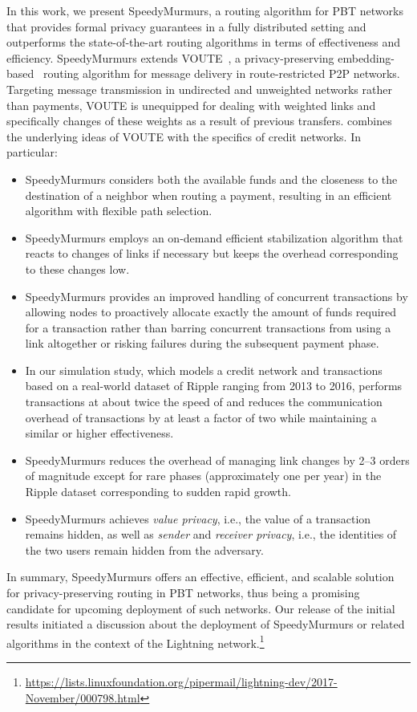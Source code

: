  

In this work, we present SpeedyMurmurs, a routing algorithm for PBT networks 
that provides formal privacy guarantees in a fully distributed setting and outperforms the state-of-the-art 
routing algorithms in terms of effectiveness and efficiency. 
SpeedyMurmurs extends VOUTE~\cite{roos2016anonymous}, a privacy-preserving embedding-based~\cite{papadimitriou2004conjecture} routing algorithm for message delivery in route-restricted P2P networks.  
Targeting message transmission in undirected and unweighted networks rather than payments, VOUTE 
is unequipped for dealing with weighted links and specifically changes of these weights as a result of previous transfers.  
\oursys combines the underlying ideas of VOUTE with the specifics of credit networks.      
In particular:
\begin{itemize}
\item SpeedyMurmurs considers both the available funds and the closeness to the destination of a neighbor when routing a payment, resulting in an efficient algorithm with flexible path selection.  
\item SpeedyMurmurs employs an on-demand efficient stabilization algorithm that reacts to changes of links if necessary but keeps the overhead corresponding to these changes low.
\item SpeedyMurmurs provides an improved handling of concurrent transactions by allowing nodes to proactively allocate exactly the amount of funds required for a transaction rather than barring concurrent transactions from using a link altogether or risking failures during the subsequent payment phase.
\item In our simulation study, which models a credit network and transactions based on a real-world dataset of Ripple ranging from 2013 to 2016, \oursys performs transactions at about twice the speed of \cnsysname and reduces the communication overhead of transactions by at least a factor of two while maintaining a similar or higher effectiveness. 
\item SpeedyMurmurs reduces the overhead of managing link changes by 2--3 orders of magnitude except for rare phases (approximately one per year) in the Ripple dataset corresponding to sudden rapid growth.
\item SpeedyMurmurs achieves \emph{value privacy}, i.e., the value of a transaction remains hidden, as well as \emph{sender} and \emph{receiver privacy}, i.e., the identities of the two users remain hidden from the adversary.   
\end{itemize}
In summary, SpeedyMurmurs offers an effective, efficient, and scalable solution for privacy-preserving routing in PBT networks, thus being a promising candidate for upcoming deployment of such networks.  Our release of the initial results initiated a discussion about the deployment of SpeedyMurmurs or related algorithms in the context of the Lightning network.\footnote{\url{https://lists.linuxfoundation.org/pipermail/lightning-dev/2017-November/000798.html}}

